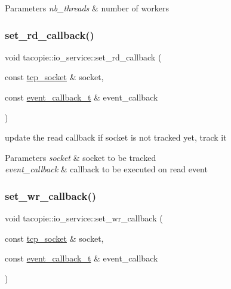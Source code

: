 \begin{DoxyParams}{Parameters}
{\em nb\+\_\+threads} & number of workers \\
\hline
\end{DoxyParams}
\mbox{\label{classtacopie_1_1io__service_a8094c1fec76c6821cc0c008fe524c89a}} 
\subsubsection{\texorpdfstring{set\+\_\+rd\+\_\+callback()}{set\_rd\_callback()}}
{\footnotesize\ttfamily void tacopie\+::io\+\_\+service\+::set\+\_\+rd\+\_\+callback (\begin{DoxyParamCaption}\item[{const \hyperlink{classtacopie_1_1tcp__socket}{tcp\+\_\+socket} \&}]{socket,  }\item[{const \hyperlink{classtacopie_1_1io__service_abb66850c32d9c724f4418d77bd04bcfd}{event\+\_\+callback\+\_\+t} \&}]{event\+\_\+callback }\end{DoxyParamCaption})}

update the read callback if socket is not tracked yet, track it


\begin{DoxyParams}{Parameters}
{\em socket} & socket to be tracked \\
\hline
{\em event\+\_\+callback} & callback to be executed on read event \\
\hline
\end{DoxyParams}
\mbox{\label{classtacopie_1_1io__service_a7c4f56c7790c7ba52b09837a42aaffb1}} 
\subsubsection{\texorpdfstring{set\+\_\+wr\+\_\+callback()}{set\_wr\_callback()}}
{\footnotesize\ttfamily void tacopie\+::io\+\_\+service\+::set\+\_\+wr\+\_\+callback (\begin{DoxyParamCaption}\item[{const \hyperlink{classtacopie_1_1tcp__socket}{tcp\+\_\+socket} \&}]{socket,  }\item[{const \hyperlink{classtacopie_1_1io__service_abb66850c32d9c724f4418d77bd04bcfd}{event\+\_\+callback\+\_\+t} \&}]{event\+\_\+callback }\end{DoxyParamCaption})}

